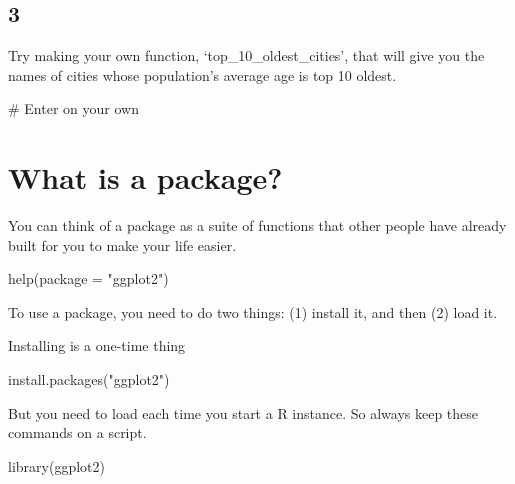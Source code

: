 \documentclass[
  letterpaper,
]{book}
\newenvironment{Shaded}{\begin{snugshade}}{\end{snugshade}}
\newcommand{\AttributeTok}[1]{\textcolor[rgb]{0.40,0.45,0.13}{#1}}
\newcommand{\CommentTok}[1]{\textcolor[rgb]{0.37,0.37,0.37}{#1}}
\newcommand{\FunctionTok}[1]{\textcolor[rgb]{0.28,0.35,0.67}{#1}}
\newcommand{\NormalTok}[1]{\textcolor[rgb]{0.00,0.23,0.31}{#1}}
\newcommand{\StringTok}[1]{\textcolor[rgb]{0.13,0.47,0.30}{#1}}
\theoremstyle{definition}
\theoremstyle{definition}
\theoremstyle{plain}
\theoremstyle{definition}
\theoremstyle{plain}
\theoremstyle{plain}
\theoremstyle{remark}
\begin{document}
\hypertarget{section-2}{%
\subsection*{3}\label{section-2}}

Try making your own function, `top\_10\_oldest\_cities', that will give
you the names of cities whose population's average age is top 10 oldest.

\begin{Shaded}
\begin{Highlighting}[]
\CommentTok{\# Enter on your own}
\end{Highlighting}
\end{Shaded}

\hypertarget{what-is-a-package}{%
\section{What is a package?}\label{what-is-a-package}}

You can think of a package as a suite of functions that other people
have already built for you to make your life easier.

\begin{Shaded}
\begin{Highlighting}[]
\FunctionTok{help}\NormalTok{(}\AttributeTok{package =} \StringTok{"ggplot2"}\NormalTok{)}
\end{Highlighting}
\end{Shaded}

To use a package, you need to do two things: (1) install it, and then
(2) load it.

Installing is a one-time thing

\begin{Shaded}
\begin{Highlighting}[]
\FunctionTok{install.packages}\NormalTok{(}\StringTok{"ggplot2"}\NormalTok{)}
\end{Highlighting}
\end{Shaded}

But you need to load each time you start a R instance. So always keep
these commands on a script.

\begin{Shaded}
\begin{Highlighting}[]
\FunctionTok{library}\NormalTok{(ggplot2)}
\end{Highlighting}
\end{Shaded}
\end{document}
